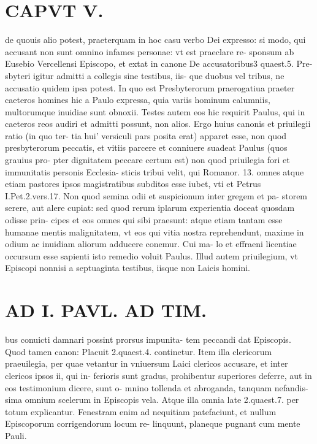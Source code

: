 \documentclass{article}
\begin{document}
\begin{pages}
\section*{CAPVT V. }
\marginpar{[ p.315 ]}\pstart de quouis alio potest, praeterquam in hoc casu verbo Dei expresso: si modo, qui accusant non sunt omnino infames personae: vt est praeclare re- sponsum ab Eusebio Vercellensi Episcopo, et extat in canone De accusatoribus3 quaest.5. Pre- sbyteri igitur admitti a collegis sine testibus, iis- que duobus vel tribus, ne accusatio quidem ipsa potest. In quo est Presbyterorum praerogatiua praeter caeteros homines hic a Paulo expressa, quia variis hominum calumniis, multorumque inuidiae sunt obnoxii.  \pend\pstart Testes autem eos hic requirit Paulus, qui in caeteros reos audiri et admitti possunt, non alios. Ergo huius canonis et priuilegii ratio (in quo ter- tia hui' versiculi pars posita erat) apparet esse, non quod presbyterorum peccatis, et vitiis parcere et conniuere suadeat Paulus (quos grauius pro- pter dignitatem peccare certum est) non quod priuilegia fori et immunitatis personis Ecclesia- sticis tribui velit, qui Romanor. 13. omnes atque etiam pastores ipsos magistratibus subditos esse iubet, vti et Petrus I.Pet.2.vers.17. Non quod semina odii et suspicionum inter gregem et pa- storem serere, aut alere cupiat: sed quod rerum iplarum experientia doceat quosdam odisse prin- cipes et eos omnes qui sibi praesunt: atque etiam tantam esse humanae mentis malignitatem, vt eos qui vitia nostra reprehendunt, maxime in odium ac inuidiam aliorum adducere conemur. Cui ma- lo et effraeni licentiae occursum esse sapienti isto remedio voluit Paulus.  \pend\pstart Illud autem priuilegium, vt Episcopi nonnisi a septuaginta testibus, iisque non Laicis homini.  \pend
\section*{AD I. PAVL. AD TIM. }
\marginpar{[ p.310 ]}\pstart bus conuicti damnari possint prorsus impunita- tem peccandi dat Episcopis. Quod tamen canon: Placuit 2.quaest.4. continetur. Item illa clericorum praeuilegia, per quae vetantur in vniuersum Laici clericos accusare, et inter clericos ipsos ii, qui in- ferioris sunt gradus, prohibentur superiores deferre, aut in eos testimonium dicere, sunt o- mnino tollenda et abroganda, tanquam nefandis- sima omnium scelerum in Episcopis vela. Atque illa omnia late 2.quaest.7. per totum explicantur.  \pend\pstart Fenestram enim ad nequitiam patefaciunt, et nullum Episcoporum corrigendorum locum re- linquunt, planeque pugnant cum mente Pauli.  \pend
{}
{}

\end{pages}
\end{document}
